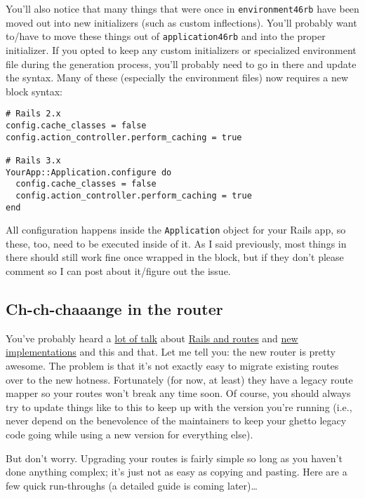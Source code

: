 \documentclass{book}
\begin{document}
You'{}ll also notice that many things that were once in {\colorbox[rgb]{0.87,0.87,0.87}{\tt environment\char46rb}} have been moved out into new initializers (such as custom inflections). You'{}ll probably want to/have to move these things out of {\colorbox[rgb]{0.87,0.87,0.87}{\tt application\char46rb}} and into the proper initializer. If you opted to keep any custom initializers or specialized environment file during the generation process, you'{}ll probably need to go in there and update the syntax. Many of these (especially the environment files) now requires a new block syntax:

\begin{verbatim}# Rails 2.x
config.cache_classes = false
config.action_controller.perform_caching = true

# Rails 3.x
YourApp::Application.configure do
  config.cache_classes = false
  config.action_controller.perform_caching = true
end\end{verbatim}
All configuration happens inside the {\colorbox[rgb]{0.87,0.87,0.87}{\tt Application}} object for your Rails app, so these, too, need to be executed inside of it. As I said previously, most things in there should still work fine once wrapped in the block, but if they don'{}t please comment so I can post about it/figure out the issue.

\hypertarget{chchchaaange_in_the_router}{}\subsection*{{Ch-ch-chaaange in the router}}\label{chchchaaange_in_the_router}

You'{}ve probably heard a \href{http://yehudakatz.com/2009/12/26/the-rails-3-router-rack-it-up/}{lot of talk} about \href{http://rizwanreza.com/2009/12/20/revamped-routes-in-rails-3}{Rails and routes} and \href{http://github.com/jm/krauter}{new} \href{http://github.com/josh/rack-mount}{implementations} and this and that. Let me tell you: the new router is pretty awesome. The problem is that it'{}s not exactly easy to migrate existing routes over to the new hotness. Fortunately (for now, at least) they have a legacy route mapper so your routes won'{}t break any time soon. Of course, you should always try to update things like to this to keep up with the version you'{}re running (i.e., never depend on the benevolence of the maintainers to keep your ghetto legacy code going while using a new version for everything else).

But don'{}t worry. Upgrading your routes is fairly simple so long as you haven'{}t done anything complex; it'{}s just not as easy as copying and pasting. Here are a few quick run-throughs (a detailed guide is coming later)\ldots{}
\end{document}
